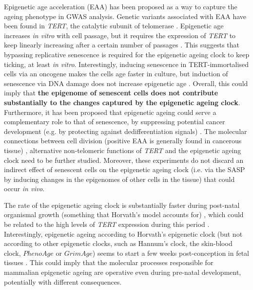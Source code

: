 Epigenetic age acceleration (\acrshort{EAA}) has been proposed as a way to capture the ageing phenotype in GWAS analysis. Genetic variants associated with \acrshort{EAA} have been found in \textit{TERT}, the catalytic subunit of telomerase \citep{Lu2018}. Epigenetic age increases \textit{in vitro} with cell passage, but it requires the expression of \textit{TERT} to keep linearly increasing after a certain number of passages \citep{Lu2018}. This suggests that bypassing replicative senescence is required for the epigenetic ageing clock to keep ticking, at least \textit{in vitro}. Interestingly, inducing senescence in TERT-immortalised cells via an oncogene makes the cells age faster in culture, but induction of senescence via DNA damage does not increase epigenetic age \citep{Lowe2016}. Overall, this could imply that \textbf{the epigenome of senescent cells does not contribute substantially to the changes captured by the epigenetic ageing clock}. Furthermore, it has been proposed that epigenetic ageing could serve a complementary role to that of senescence, by suppressing potential cancer development (e.g. by protecting against dedifferentiation signals) \citep{Horvath2018}. The molecular connections between cell division (positive \acrshort{EAA} is generally found in cancerous tissue) \citep{Hannum2013,Horvath2013}, alternative non-telomeric functions of \textit{TERT} and the epigenetic ageing clock need to be further studied. Moreover, these experiments do not discard an indirect effect of senescent cells on the epigenetic ageing clock (i.e. via the \acrshort{SASP} by inducing changes in the epigenomes of other cells in the tissue) that could occur \textit{in vivo}. 

\bigskip

The rate of the epigenetic ageing clock is substantially faster during post-natal organismal growth (something that Horvath's model accounts for) \citep{Horvath2013}, which could be related to the high levels of \textit{TERT} expression during this period \citep{Lu2018}. Interestingly, epigenetic ageing according to Horvath's epigenetic clock (but not according to other epigenetic clocks, such as Hannum's clock, the skin-blood clock, $PhenoAge$ or $GrimAge$) seems to start a few weeks post-conception in fetal tissues \citep{Hoshino2019}. This could imply that the molecular processes responsible for mammalian epigenetic ageing are operative even during pre-natal development, potentially with different consequences. 

\bigskip

